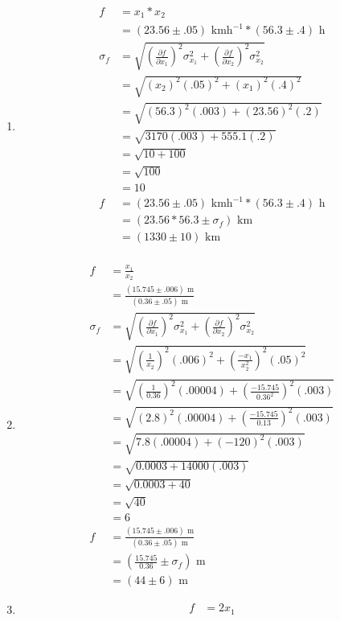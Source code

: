 \documentclass{article}
\begin{document}
\begin{enumerate}
\begin{enumerate}
\item
\begin{align*}
f &= x_1 * x_2\\
&= (23.56 \pm .05)\text{ kmh}^{-1} * (56.3 \pm .4)\text{ h}\\
\sigma_{f} &= \sqrt{(\frac{\partial f}{\partial x_1})^2\sigma_{x_1}^2 + (\frac{\partial f}{\partial x_2})^2\sigma_{x_2}^2}\\
&= \sqrt{(x_2)^2(.05)^2 + (x_1)^2(.4)^2}\\
&= \sqrt{(56.3)^2(.003) + (23.56)^2(.2)}\\
&= \sqrt{3170(.003) + 555.1(.2)}\\
&= \sqrt{10 + 100}\\
&= \sqrt{100}\\
&= 10\\
f &= (23.56 \pm .05)\text{ kmh}^{-1} * (56.3 \pm .4)\text{ h}\\
&= (23.56 * 56.3 \pm \sigma_{f})\text{ km}\\
&= (1330 \pm 10)\text{ km}\\
\end{align*}
\item
\begin{align*}
f &= \frac{x_1}{x_2}\\
&= \frac{(15.745 \pm .006)\text{ m}}{(0.36 \pm .05)\text{ m}}\\
\sigma_{f} &= \sqrt{(\frac{\partial f}{\partial x_1})^2\sigma_{x_1}^2 + (\frac{\partial f}{\partial x_2})^2\sigma_{x_2}^2}\\
&= \sqrt{(\frac1{x_2})^2(.006)^2 + (\frac{-x_1}{x_2^2})^2(.05)^2}\\
&= \sqrt{(\frac1{0.36})^2(.00004) + (\frac{-15.745}{0.36^2})^2(.003)}\\
&= \sqrt{(2.8)^2(.00004) + (\frac{-15.745}{0.13})^2(.003)}\\
&= \sqrt{7.8(.00004) + (-120)^2(.003)}\\
&= \sqrt{0.0003 + 14000(.003)}\\
&= \sqrt{0.0003 + 40}\\
&= \sqrt{40}\\
&= 6\\
f &= \frac{(15.745 \pm .006)\text{ m}}{(0.36 \pm .05)\text{ m}}\\
&= (\frac{15.745}{0.36} \pm \sigma_{f})\text{ m}\\
&= (44 \pm 6)\text{ m}
\end{align*}
\item
\begin{align*}
f &= 2x_1\\

\end{align*}
\end{enumerate}
\end{enumerate}
\end{document}
